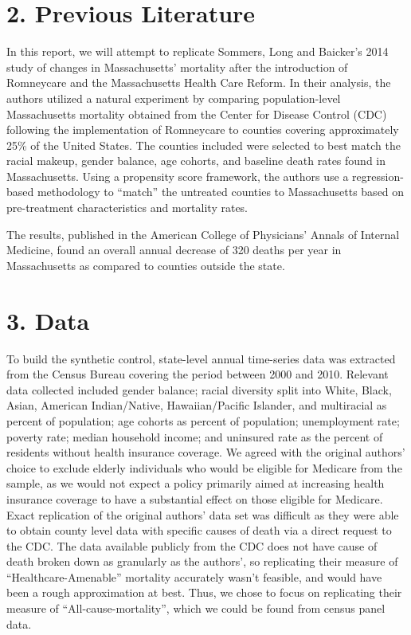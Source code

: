 \documentclass[
]{article}
\begin{document}
\hypertarget{previous-literature}{%
\section{2. Previous Literature}\label{previous-literature}}

In this report, we will attempt to replicate Sommers, Long and Baicker's
2014 study of changes in Massachusetts' mortality after the introduction
of Romneycare and the Massachusetts Health Care Reform. In their
analysis, the authors utilized a natural experiment by comparing
population-level Massachusetts mortality obtained from the Center for
Disease Control (CDC) following the implementation of Romneycare to
counties covering approximately 25\% of the United States. The counties
included were selected to best match the racial makeup, gender balance,
age cohorts, and baseline death rates found in Massachusetts. Using a
propensity score framework, the authors use a regression-based
methodology to ``match'' the untreated counties to Massachusetts based
on pre-treatment characteristics and mortality rates.

The results, published in the American College of Physicians' Annals of
Internal Medicine, found an overall annual decrease of 320 deaths per
year in Massachusetts as compared to counties outside the state.

\hypertarget{data}{%
\section{3. Data}\label{data}}

To build the synthetic control, state-level annual time-series data was
extracted from the Census Bureau covering the period between 2000 and
2010. Relevant data collected included gender balance; racial diversity
split into White, Black, Asian, American Indian/Native, Hawaiian/Pacific
Islander, and multiracial as percent of population; age cohorts as
percent of population; unemployment rate; poverty rate; median household
income; and uninsured rate as the percent of residents without health
insurance coverage. We agreed with the original authors' choice to
exclude elderly individuals who would be eligible for Medicare from the
sample, as we would not expect a policy primarily aimed at increasing
health insurance coverage to have a substantial effect on those eligible
for Medicare. Exact replication of the original authors' data set was
difficult as they were able to obtain county level data with specific
causes of death via a direct request to the CDC. The data available
publicly from the CDC does not have cause of death broken down as
granularly as the authors', so replicating their measure of
``Healthcare-Amenable'' mortality accurately wasn't feasible, and would
have been a rough approximation at best. Thus, we chose to focus on
replicating their measure of ``All-cause-mortality'', which we could be
found from census panel data.
\end{document}
